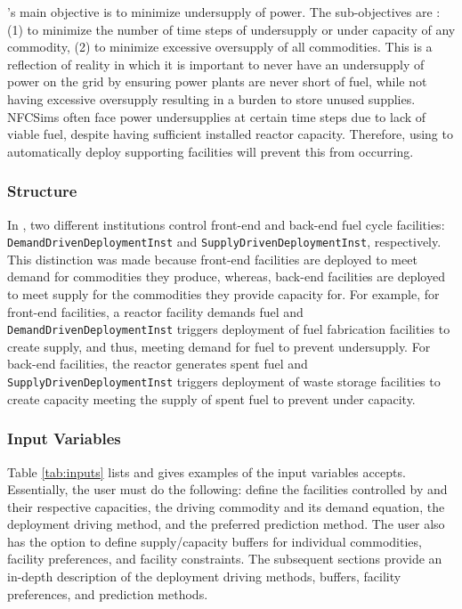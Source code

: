 \deploy's main objective is to minimize
undersupply of power. 
The sub-objectives are : (1) to minimize the number of time 
steps of undersupply or under capacity of any 
commodity, (2) to minimize excessive oversupply of all commodities.
This is a reflection of reality in which it is important to 
never have an undersupply of power on the grid by ensuring power 
plants are never short of fuel, while not 
having excessive oversupply resulting in a burden to store unused 
supplies. 
\glspl{NFCSim} often face power undersupplies at certain time steps 
due to lack of viable fuel, despite having sufficient installed 
reactor capacity.  
Therefore, using \deploy to automatically deploy supporting facilities 
will prevent this from occurring.  

\subsubsection{\textbf{Structure}}
In \deploy, two different institutions control 
front-end and back-end fuel cycle facilities: 
\texttt{DemandDrivenDeploymentInst} and 
\texttt{SupplyDrivenDeploymentInst}, respectively. 
This distinction was made because front-end facilities 
are deployed to meet demand for commodities they produce, 
whereas, back-end facilities are deployed to meet supply for the 
commodities they provide capacity for. 
For example, for front-end facilities, a reactor facility 
demands fuel and \texttt{DemandDrivenDeploymentInst} 
triggers deployment of fuel fabrication facilities to create 
supply, and thus, meeting demand for fuel to prevent undersupply. 
For back-end facilities, the reactor generates spent fuel and 
\texttt{SupplyDrivenDeploymentInst} triggers deployment of 
waste storage facilities to create capacity meeting the supply 
of spent fuel to prevent under capacity. 

\subsubsection{\textbf{Input Variables}}
Table \ref{tab:inputs} lists and gives examples of the input 
variables \deploy accepts. 
Essentially, the user must do the following: 
define the facilities controlled by \deploy and their respective 
capacities, the driving commodity and 
its demand equation, the deployment driving method, and the 
preferred prediction method. 
The user also has the option to define supply/capacity buffers 
for individual commodities, facility preferences, and facility 
constraints. 
The subsequent sections provide an 
in-depth description of the deployment driving methods, buffers, 
facility preferences, and prediction methods. 

